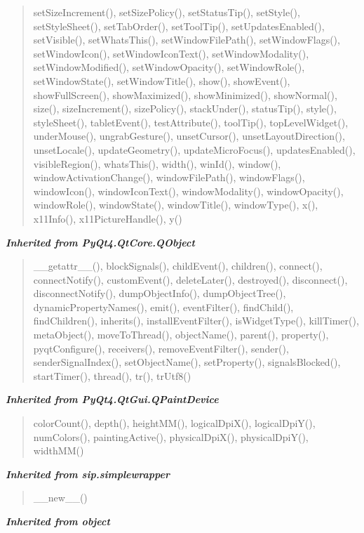 \begin{quote}
setSizeIncrement(), setSizePolicy(), setStatusTip(), setStyle(), setStyleSheet(), setTabOrder(), setToolTip(), setUpdatesEnabled(), setVisible(), setWhatsThis(), setWindowFilePath(), setWindowFlags(), setWindowIcon(), setWindowIconText(), setWindowModality(), setWindowModified(), setWindowOpacity(), setWindowRole(), setWindowState(), setWindowTitle(), show(), showEvent(), showFullScreen(), showMaximized(), showMinimized(), showNormal(), size(), sizeIncrement(), sizePolicy(), stackUnder(), statusTip(), style(), styleSheet(), tabletEvent(), testAttribute(), toolTip(), topLevelWidget(), underMouse(), ungrabGesture(), unsetCursor(), unsetLayoutDirection(), unsetLocale(), updateGeometry(), updateMicroFocus(), updatesEnabled(), visibleRegion(), whatsThis(), width(), winId(), window(), windowActivationChange(), windowFilePath(), windowFlags(), windowIcon(), windowIconText(), windowModality(), windowOpacity(), windowRole(), windowState(), windowTitle(), windowType(), x(), x11Info(), x11PictureHandle(), y()
\end{quote}

\large{\textbf{\textit{Inherited from PyQt4.QtCore.QObject}}}

\begin{quote}
\_\_getattr\_\_(), blockSignals(), childEvent(), children(), connect(), connectNotify(), customEvent(), deleteLater(), destroyed(), disconnect(), disconnectNotify(), dumpObjectInfo(), dumpObjectTree(), dynamicPropertyNames(), emit(), eventFilter(), findChild(), findChildren(), inherits(), installEventFilter(), isWidgetType(), killTimer(), metaObject(), moveToThread(), objectName(), parent(), property(), pyqtConfigure(), receivers(), removeEventFilter(), sender(), senderSignalIndex(), setObjectName(), setProperty(), signalsBlocked(), startTimer(), thread(), tr(), trUtf8()
\end{quote}

\large{\textbf{\textit{Inherited from PyQt4.QtGui.QPaintDevice}}}

\begin{quote}
colorCount(), depth(), heightMM(), logicalDpiX(), logicalDpiY(), numColors(), paintingActive(), physicalDpiX(), physicalDpiY(), widthMM()
\end{quote}

\large{\textbf{\textit{Inherited from sip.simplewrapper}}}

\begin{quote}
\_\_new\_\_()
\end{quote}

\large{\textbf{\textit{Inherited from object}}}

